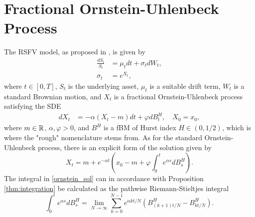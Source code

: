 \section{Fractional Ornstein-Uhlenbeck Process}
The RSFV model, as proposed in \cite{volisrough}, is given by
\begin{align}
    \frac{dS_{t}}{S_{t}}&= \mu_{t}dt + \sigma_{t}dW_{t},\\
    \sigma_{t}&= e^{X_{t}},
\end{align}
where $t\in [0,T]$, $S_{t}$ is the underlying asset, $\mu_{t}$ is a suitable drift term, $W_{t}$ is a standard Brownian motion, and $X_{t}$ is a fractional Ornstein-Uhlenbeck process satisfying the SDE
\begin{align}
    dX_{t}&= -\alpha(X_{t}-m)dt + \varphi dB^{H}_{t},\quad X_{0}=x_{0},
\end{align}
where $m \in \mathbb{R}$, $\alpha,\varphi >0$, and $B^{H}$ is a fBM of Hurst index $H\in(0,1/2)$, which is where the "rough" nomenclature stems from. As for the standard Ornstein-Uhlenbeck process, there is an explicit form of the solution given by
\begin{equation}\label{ornstein_sol}
    X_{t}= m + e^{-\alpha t}\left(x_{0}-m+\varphi\int_{0}^{t}e^{\alpha s}dB_{s}^{H}\right).
\end{equation}
The integral in \eqref{ornstein_sol} can in accordance with Proposition \ref{thm:integration} be calculated as the pathwise Riemann-Stieltjes integral
\begin{equation}\label{eq:riemann}
    \int_{0}^{t}e^{\alpha s}dB_{s}^{H}=\lim_{N\to\infty}\sum_{k=0}^{N-1}e^{\alpha k t/N}\left(B_{(k+1)t/N}^{H}-B_{kt/N}^{H}\right).
\end{equation}
